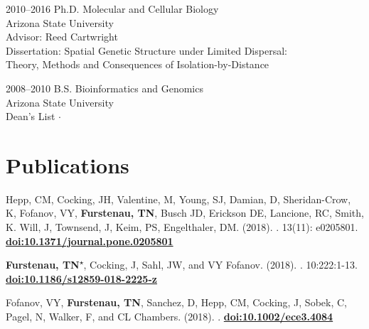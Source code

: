 \documentclass[]{cv-style}          %
\begin{document}
\begin{entrylist}
{2010--2016}
{Ph.D. Molecular and Cellular Biology}
{\\Arizona State University\\
Advisor: Reed Cartwright\\
Dissertation: Spatial Genetic Structure under Limited Dispersal:\\Theory, Methods and Consequences of Isolation-by-Distance
}
{\vspace{-0.3cm}}
     
{2008--2010}
{B.S. Bioinformatics and Genomics}
{\\Arizona State University\\
Dean's List $\cdotp$  }{\vspace{-0.3cm}}
\end{entrylist} 

 
\section{Publications}

Hepp, CM, Cocking, JH, Valentine, M, Young, SJ, Damian, D, Sheridan-Crow, K, Fofanov, VY, \textbf{Furstenau, TN}, Busch JD, Erickson DE, Lancione, RC, Smith, K. Will, J, Townsend, J, Keim, PS, Engelthaler, DM. (2018).  . 13(11): e0205801. \textbf{\href{https://doi.org/10.1371/journal.pone.0205801}{doi:10.1371/journal.pone.0205801}}

\textbf{Furstenau, TN}\textsuperscript{$\star$}, Cocking, J, Sahl, JW, and VY Fofanov. (2018).  . 10:222:1-13. \textbf{\href{https://doi.org/10.1186/s12859-018-2225-z}{doi:10.1186/s12859-018-2225-z}}

Fofanov, VY, \textbf{Furstenau, TN}\textsuperscript{\Letter}, Sanchez, D, Hepp, CM, Cocking, J, Sobek, C, Pagel, N, Walker, F, and CL Chambers. (2018).  . \textbf{\href{https://doi.org/10.1002/ece3.4084}{doi:10.1002/ece3.4084}}
\end{document}
